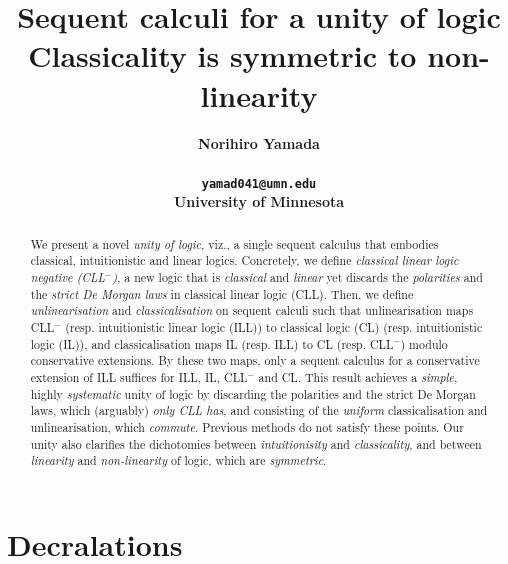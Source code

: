 \documentclass[a4paper]{article}
\newcommand{\keywords}[1]{\par\addvspace\baselineskip
\noindent\keywordname\enspace\ignorespaces#1}
\theoremstyle{definition}
\theoremstyle{theorem}
\theoremstyle{remark}
\begin{document}
\title{\Huge \bfseries Sequent calculi for a unity of logic \\ \huge \bfseries Classicality is symmetric to non-linearity}
\author{\Large \bfseries Norihiro Yamada \\ \\
{\tt yamad041@umn.edu} \\
University of Minnesota
}

\maketitle

\begin{abstract}
We present a novel \emph{unity of logic}, viz., a single sequent calculus that embodies classical, intuitionistic and linear logics.
Concretely, we define \emph{classical linear logic negative (CLL$^-$)}, a new logic that is \emph{classical} and \emph{linear} yet discards the \emph{polarities} and the \emph{strict De Morgan laws} in classical linear logic (CLL).
Then, we define \emph{unlinearisation} and \emph{classicalisation} on sequent calculi such that unlinearisation maps CLL$^-$ (resp. intuitionistic linear logic (ILL)) to classical logic (CL) (resp. intuitionistic logic (IL)), and classicalisation maps IL (resp. ILL) to CL (resp. CLL$^-$) modulo conservative extensions.
By these two maps, only a sequent calculus for a conservative extension of ILL suffices for ILL, IL, CLL$^-$ and CL.
This result achieves a \emph{simple}, highly \emph{systematic} unity of logic by discarding the polarities and the strict De Morgan laws, which (arguably) \emph{only CLL has}, and consisting of the \emph{uniform} classicalisation and unlinearisation, which \emph{commute}.
Previous methods do not satisfy these points.
Our unity also clarifies the dichotomies between \emph{intuitionisity} and \emph{classicality}, and between \emph{linearity} and \emph{non-linearity} of logic, which are \emph{symmetric}.
\end{abstract}

\tableofcontents

\section*{Decralations}
\end{document}
